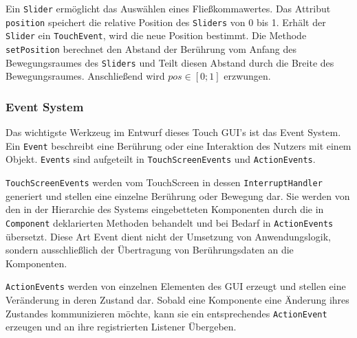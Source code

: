 		\medskip
		\begin{figure}
			\label{uml-slider}
		\end{figure}
		Ein \texttt{Slider} ermöglicht das Auswählen eines Fließkommawertes.
		Das Attribut \texttt{position} speichert die relative Position des \texttt{Sliders} von 0 bis 1.
		Erhält der \texttt{Slider} ein \texttt{TouchEvent}, wird die neue Position bestimmt.
		Die Methode \texttt{setPosition} berechnet den Abstand der Berührung vom Anfang des Bewegungsraumes des \texttt{Sliders}
		und Teilt diesen Abstand durch die Breite des Bewegungsraumes. Anschließend wird $pos \in [0; 1]$ erzwungen.
		
	\subsubsection{Event System}\label{sec:EventSystem}
		Das wichtigste Werkzeug im Entwurf dieses Touch GUI's ist das Event System.
		Ein \texttt{Event} beschreibt eine Berührung oder eine Interaktion des Nutzers mit einem Objekt.
		\texttt{Events} sind aufgeteilt in \texttt{TouchScreenEvents} und \texttt{ActionEvents}.

		\texttt{TouchScreenEvents} werden vom TouchScreen in dessen \texttt{InterruptHandler} generiert und stellen eine einzelne Berührung oder Bewegung dar.
		Sie werden von den in der Hierarchie des Systems eingebetteten Komponenten durch die in \texttt{Component} deklarierten Methoden behandelt
		und bei Bedarf in \texttt{ActionEvents} übersetzt.
		Diese Art Event dient nicht der Umsetzung von Anwendungslogik, sondern ausschließlich der Übertragung von Berührungsdaten an die Komponenten.
		
		\texttt{ActionEvents} werden von einzelnen Elementen des GUI erzeugt und stellen eine Veränderung in deren Zustand dar.
		Sobald eine Komponente eine Änderung ihres Zustandes kommunizieren möchte, kann sie ein entsprechendes \texttt{ActionEvent} erzeugen
		und an ihre registrierten Listener Übergeben.
		
		